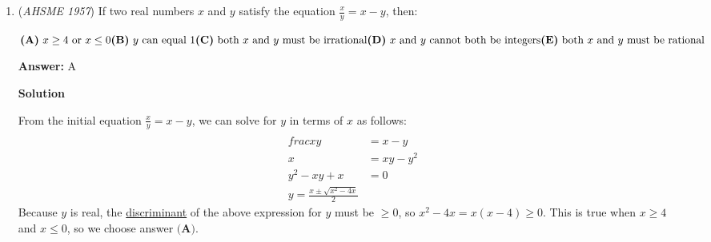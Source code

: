 \begin{enumerate}
\textbf{Solution}

Because $\triangle ACD$ is \href{https://artofproblemsolving.com/wiki/index.php?title=Isosceles\_triangle}{isosceles} with $AC=CD$, $\measuredangle CAD=\measuredangle CDA=\theta$, where $\theta$ is some angle measure. Because $\angle CDA$ and $\angle ADB$ form a \href{https://artofproblemsolving.com/wiki/index.php?title=Straight\_angle}{straight angle}, $\measuredangle ADB = 180^{\circ}-\theta$. Thus, because the interior angles of a triangle add to $180^{\circ}$, $\measuredangle BAD + \measuredangle ABC = \theta$, so $\measuredangle ABC = \theta - \measuredangle BAD$. Notice that $\measuredangle CAB = \theta + \measuredangle BAD$. With all of this information and recalling that, from the problem, $\measuredangle CAB - \measuredangle ABC = 30^{\circ}$, we see that:\begin{align*}\measuredangle CAB - \measuredangle ABC &= 30^{\circ} \\\theta + \measuredangle BAD - (\theta - \measuredangle BAD) &= 30^{\circ} \\2\measuredangle BAD &= 30^{\circ} \\\measuredangle BAD &= 15^{\circ}\end{align*}
Thus, our answer is $\boxed{\textbf{(E) }15^{\circ}}$.

 


	\item (\textit{AHSME 1957}) If two real numbers $x$ and $y$ satisfy the equation $\frac{x}{y} = x - y$, then: 


 $\textbf{(A)}\ {x \ge 4}\text{ or }{x \le 0}\qquad \\  \textbf{(B)}\ {y}\text{ can equal }{1}\qquad \\  \textbf{(C)}\ \text{both }{x}\text{ and }{y}\text{ must be irrational}\qquad\\  \textbf{(D)}\ {x}\text{ and }{y}\text{ cannot both be integers}\qquad\\  \textbf{(E)}\ \text{both }{x}\text{ and }{y}\text{ must be rational}$

 \textbf{Answer: }A



\textbf{Solution}

From the initial equation $\frac x y = x-y$, we can solve for $y$ in terms of $x$ as follows:\begin{align*}\\frac x y &= x-y \\x &= xy-y^2 \\y^2-xy+x &= 0 \\y = \frac{x \pm \sqrt{x^2-4x}}2\end{align*}
Because $y$ is real, the \href{https://artofproblemsolving.com/wiki/index.php?title=Discriminant}{discriminant} of the above expression for $y$ must be $\geq 0$, so $x^2-4x=x(x-4) \geq 0$. This is true when $x \geq 4$ and $x \leq 0$, so we choose answer $\boxed{\textbf{(A)}}$.


\end{enumerate}
